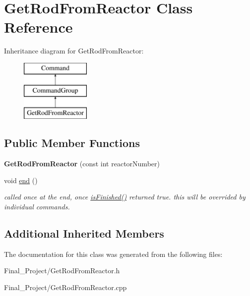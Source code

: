 \hypertarget{classGetRodFromReactor}{\section{Get\-Rod\-From\-Reactor Class Reference}
\label{classGetRodFromReactor}
}
Inheritance diagram for Get\-Rod\-From\-Reactor\-:\begin{figure}[H]
\begin{center}
\leavevmode
\includegraphics[height=3.000000cm]{classGetRodFromReactor}
\end{center}
\end{figure}
\subsection*{Public Member Functions}
\begin{DoxyCompactItemize}
\item 
\hypertarget{classGetRodFromReactor_ae6432d3e1fd6ca0e882d9cbff1b14737}{{\bfseries Get\-Rod\-From\-Reactor} (const int reactor\-Number)}\label{classGetRodFromReactor_ae6432d3e1fd6ca0e882d9cbff1b14737}

\item 
\hypertarget{classGetRodFromReactor_a8d375cbbf822ea0f22058a264347bd37}{void \hyperlink{classGetRodFromReactor_a8d375cbbf822ea0f22058a264347bd37}{end} ()}\label{classGetRodFromReactor_a8d375cbbf822ea0f22058a264347bd37}

\begin{DoxyCompactList}\small\item\em called once at the end, once \hyperlink{classCommandGroup_a96807a2763adf9e21ebf2cb9e3574e3c}{is\-Finished()} returned true. this will be overrided by individual commands. \end{DoxyCompactList}\end{DoxyCompactItemize}
\subsection*{Additional Inherited Members}


The documentation for this class was generated from the following files\-:\begin{DoxyCompactItemize}
\item 
Final\-\_\-\-Project/Get\-Rod\-From\-Reactor.\-h\item 
Final\-\_\-\-Project/Get\-Rod\-From\-Reactor.\-cpp\end{DoxyCompactItemize}
